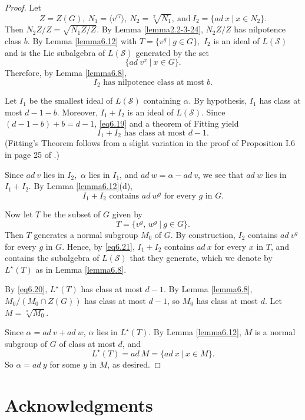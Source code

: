 \documentclass[mathscr]{amsart}
\theoremstyle{theorem}
\theoremstyle{definition}
\numberwithin{equation}{section}
\def\S{\mathcal{S}}
\begin{document}
\begin{proof}
Let
$$Z=Z(G),\ N_1=\langle v^G\rangle,\ N_2=\sqrt[\pi]{N_1},\ \text{and}\ I_2=\{ad\ x\ |\ x\in N_2\}.$$
Then $N_2Z/Z=\sqrt{N_1Z/Z}$. By Lemma \ref{lemma2.2-3-24}, $N_2Z/Z$
has nilpotence class $b$. By Lemma \ref{lemma6.12} with $T=\{v^g\ |\
g\in G\},$ $I_2$ is an ideal of $L(\S)$ and is the Lie subalgebra of
$L(\S)$ generated by the set
$$\{ad\ v^x\ |\ x\in G\}.$$
Therefore, by Lemma \ref{lemma6.8},
\begin{equation}\label{eq6.19}
I_2\text{ has nilpotence class at most }b.
\end{equation}

Let $I_1$ be the smallest ideal of $L(\S)$ containing $\alpha.$ By
hypothesis, $I_1$ has class at most $d-1-b$. Moreover, $I_1+I_2$ is
an ideal of $L(\S).$ Since $(d-1-b)+b=d-1$, \eqref{eq6.19} and a
theorem of Fitting yield
\begin{equation}\label{eq6.20}
I_1+I_2\text{ has class at most }d-1.
\end{equation}
(Fitting's Theorem follows from a slight variation in the proof of
Proposition I.6 in page 25 of \cite{Jac}.)

Since $ad\ v$ lies in $I_2,$ $\alpha$ lies in $I_1$, and $ad\
w=\alpha-ad\ v$, we see that $ad\ w$ lies in $I_1+I_2$. By Lemma
\ref{lemma6.12}(d),
\begin{equation}\label{eq6.21}
I_1+I_2\text{ contains }ad\ w^g\text{ for every $g$ in } G.
\end{equation}

Now let $T$ be the subset of $G$ given by
$$T=\{v^g,\,w^g\ |\ g\in G\}.$$
Then $T$ generates a normal subgroup $M_0$ of $G$. By construction,
$I_2$ contains $ad\ v^g$ for every $g$ in $G$. Hence, by
\eqref{eq6.21}, $I_1+I_2$ contains $ad\ x$ for every $x$ in $T$, and
contains the subalgebra of $L(\S)$ that they generate, which we
denote by $L^\star(T)$ as in Lemma \ref{lemma6.8}.

By \eqref{eq6.20}, $L^\star(T)$ has class at most $d-1.$ By Lemma
\ref{lemma6.8}, $M_0/(M_0\cap Z(G))$ has class at most $d-1$, so
$M_0$ has class at most $d$. Let $M=\sqrt[\pi]{M_0}$.

Since $\alpha=ad\ v+ad\ w$, $\alpha$ lies in $L^\star(T)$. By Lemma
\ref{lemma6.12}, $M$ is a normal subgroup of $G$ of class at most
$d$, and
$$L^\star(T)=ad\ M=\{ad\ x\ |\ x\in M\}.$$
So $\alpha=ad\ y$ for some $y$ in $M$, as desired.
\end{proof}

\section{Acknowledgments}
\end{document}
